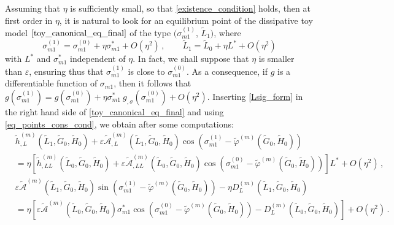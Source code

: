\documentclass[12pt,reqno]{amsart}
\numberwithin{equation}{section}
\def\A{{\mathcal A}}
\begin{document}
Assuming that
$\eta$ is sufficiently small, so that \eqref{existence_condition} holds, then at first order in $\eta$, it is natural to look for an equilibrium point of the dissipative toy model
$\eqref{toy_canonical_eq_final}$ of the type $(\sigma_{m1}^{(1)}$, $\widetilde{L}_1)$, where
\begin{equation}\label{Lsig_form}
\sigma_{m1}^{(1)}=\sigma_{m1}^{(0)}+ \eta \sigma_{m1}^*+O(\eta^2)\,, \qquad
\widetilde{L}_1=\widetilde{L}_0+\eta L^*+O(\eta^2)
\end{equation}
with $L^*$ and $\sigma_{m1}^*$ independent of $\eta$. In fact, we shall suppose that $\eta$ is smaller than $\varepsilon$, ensuring thus that  $\sigma_{m1}^{(1)}$ is close to $\sigma_{m1}^{(0)}$.
As a consequence, if $g$ is a differentiable function of $\sigma_{m1}$, then it follows that $g(\sigma_{m1}^{(1)})=g(\sigma_{m1}^{(0)})+\eta \sigma_{m1}^*\ g_{,\sigma}(\sigma_{m1}^{(0)})+O(\eta^2)$.
Inserting \eqref{Lsig_form} in the right hand side of \eqref{toy_canonical_eq_final}
and using \eqref{eq_points_cons_cond}, we obtain after some computations:
\begin{equation}\label{eq_points_diss_cond}
\begin{split}
&\widetilde{h}_{,L}^{(m)} (\widetilde{L}_1, \widetilde{G}_0, \widetilde{H}_0)+\varepsilon
\widetilde{\mathcal{A}}_{,L}^{(m)} (\widetilde{L}_1, \widetilde{G}_0, \widetilde{H}_0) \cos (\sigma_{m1}^{(1)}
-\widetilde{\varphi}^{(m)}(\widetilde{G}_0, \widetilde{H}_0))\\
&= \eta [\widetilde{h}_{,LL}^{(m)}(\widetilde{L}_0, \widetilde{G}_0, \widetilde{H}_0)
+\varepsilon \widetilde{\mathcal{A}}_{,LL}^{(m)}(\widetilde{L}_0, \widetilde{G}_0, \widetilde{H}_0)
\cos(\sigma_{m1}^{(0)}-\widetilde{\varphi}^{(m)}( \widetilde{G}_0, \widetilde{H}_0))] L^*+O(\eta^2)\,,\\
& \varepsilon \widetilde{\A}^{(m)} (\widetilde{L}_1, \widetilde{G}_0, \widetilde{H}_0)
\sin(\sigma_{m1}^{(1)}-\widetilde{\varphi}^{(m)}( \widetilde{G}_0, \widetilde{H}_0)) -
\eta D_{L}^{(m)} (\widetilde{L}_1, \widetilde{G}_0, \widetilde{H}_0)  \\
&=\eta [\varepsilon \widetilde{\mathcal{A}}^{(m)}(\widetilde{L}_0, \widetilde{G}_0, \widetilde{H}_0)
\sigma_{m1}^*\cos (\sigma_{m1}^{(0)}-\widetilde{\varphi}^{(m)}(\widetilde{G}_0, \widetilde{H}_0))-
D_L^{(m)}(\widetilde{L}_0, \widetilde{G}_0, \widetilde{H}_0)] +O(\eta^2)\,.\\
\end{split}
\end{equation}
\end{document}
